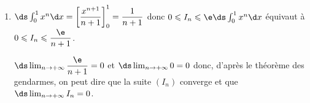 \begin{enumerate}
\begin{list}{\textbullet}{}
Sur $\left [0\;;\;1\strut\right ]$, on a $x^n\geqslant 0$ donc $x^n \e^{x} \leqslant \e x^n$.

D'après la positivité de l'intégration, $\ds\int_{0}^{1} x^n \e^{x} \d x \leqslant \ds\int_{0}^{1} x^n \e \d x$, ce qui veut dire: $I_n \leqslant \e \ds\int_{0}^{1} x^n \d x$.
\end{list} 

On a donc démontré que: $0\leqslant I_n \leqslant  \e \ds\int_{0}^{1} x^n \d x$.

		\item 
$\ds\int_{0}^{1} x^n \d x = \left [ \dfrac{x^{n+1}}{n+1} \right ]_{0}^{1}=\dfrac{1}{n+1}$
donc $0\leqslant I_n \leqslant  \e \ds\int_{0}^{1} x^n \d x$ équivaut à $0\leqslant I_n \leqslant\dfrac{\e}{n+1}$.

$\ds\lim_{n\to +\infty} \dfrac{\e}{n+1}=0$ et $\ds\lim_{n\to +\infty} 0=0$ donc, d'après le théorème des gendarmes, on peut dire que la suite $(I_n)$ converge et que $\ds\lim_{n\to +\infty} I_n=0$.
		
	\end{enumerate}
